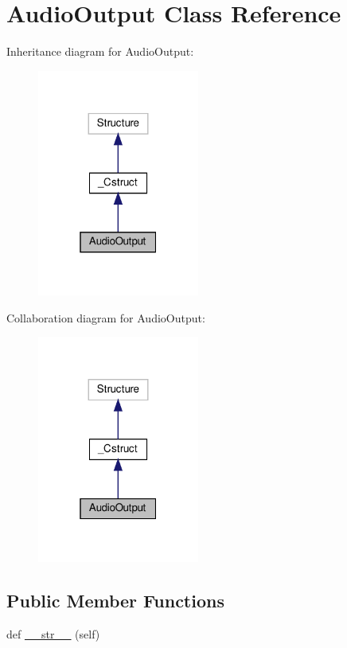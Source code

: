 \hypertarget{classvlc_1_1_audio_output}{}\section{Audio\+Output Class Reference}
\label{classvlc_1_1_audio_output}


Inheritance diagram for Audio\+Output\+:
\nopagebreak
\begin{figure}[H]
\begin{center}
\leavevmode
\includegraphics[width=151pt]{classvlc_1_1_audio_output__inherit__graph}
\end{center}
\end{figure}


Collaboration diagram for Audio\+Output\+:
\nopagebreak
\begin{figure}[H]
\begin{center}
\leavevmode
\includegraphics[width=151pt]{classvlc_1_1_audio_output__coll__graph}
\end{center}
\end{figure}
\subsection*{Public Member Functions}
\begin{DoxyCompactItemize}
\item 
def \hyperlink{classvlc_1_1_audio_output_a23e8041ce1015febe4fdace3225714f9}{\+\_\+\+\_\+str\+\_\+\+\_\+} (self)
\end{DoxyCompactItemize}


